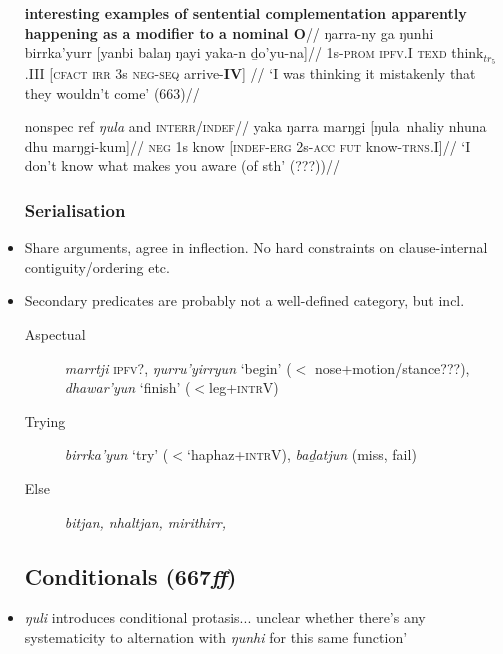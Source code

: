 \documentclass[10pt]{article}
\begin{document}
\begin{itemize}
		\a\begingl\glpreamble \textbf{interesting examples of sentential complementation apparently happening as a modifier to a nominal O}//
		\gla ŋarra-ny ga ŋunhi birrka'yurr [yanbi balaŋ ŋayi yaka-n ḏo'yu-na]//
		\glb 1s\textsc{-prom} \textsc{ipfv.I} \textsc{texd} think$_{tr_5}$.III [\textsc{cfact} \textsc{irr} 3s \textsc{neg-seq} arrive-\textbf{IV}] //
		\glft`I was thinking it mistakenly that they wouldn't come' (663)//\endgl
		
		\a\begingl\glpreamble nonspec ref \textit{ŋula} and \textsc{interr/indef}//
		\gla yaka ŋarra marŋgi [ŋula~nhaliy nhuna dhu marŋgi-kum]//
		\glb \textsc{neg} 1s know [\textsc{indef-erg} 2s\textsc{-acc} \textsc{fut} know-\textsc{trns}.I]//
		\glft`I don't know what makes you aware (of sth' (???))//\endgl\xe
		\subsubsection{Serialisation}
\item Share arguments, agree in inflection. No hard constraints on clause-internal contiguity/ordering etc.
\item Secondary predicates are probably not a well-defined category, but incl.
\begin{description}
	\item[Aspectual] \textit{marrtji} \textsc{ipfv?}, \textit{ŋurru'yirryun} `begin' ($<$ nose+motion/stance???), \textit{dhawar'yun} `finish' ($<$leg+\textsc{intrV})
	\item[Trying] \textit{birrka'yun} `try' ($<$`haphaz+\textsc{intrV}), \textit{baḏatjun} (miss, fail)
	\item[Else] \textit{bitjan, nhaltjan, mirithirr,}
\end{description}



		\subsection{Conditionals (667\textit{ff})}
		\item  \textit{ŋuli} introduces conditional protasis... unclear whether there's any systematicity to alternation with \textit{ŋunhi} for this same function' 
		

		

	\end{itemize}
\end{document}
